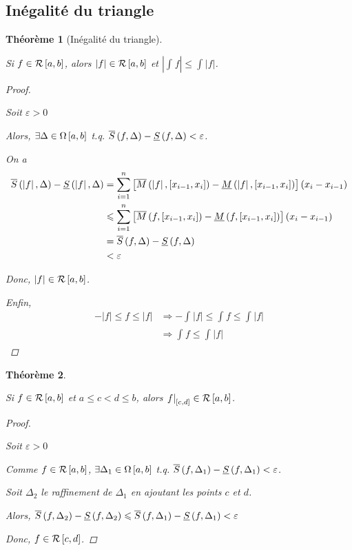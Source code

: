 \documentclass{report}
\newcommand*{\dsum}[4]{\displaystyle\sum_{#1=#2}^{#3}#4}
\newcommand*{\dint}[3]{\displaystyle\int_{#1}^{#2}#3}
\newcommand*{\abs}[1]{\left| #1 \right|}
\newcommand*{\eps}{\varepsilon}
\newcommand*{\lte}{\leqslant}
\newtheorem*{thm}{Th\'eor\`eme}
\theoremstyle{definition}
\theoremstyle{remark}
\begin{document}
	\subsection{In\'egalit\'e du triangle}
	\begin{thm}[In\'egalit\'e du triangle]
		~

		Si $f \in \riemann$, alors $\abs{f} \in \riemann$ et $\abs{\dint{}{}{f}} \lte \dint{}{}{\abs{f}}$.
		\begin{proof}~

			Soit $\eps>0$

			Alors, $\exists\Delta \in \partitions$ t.q. $\ssup{f}-\sinf{f}<\eps$.

			On a
			\begin{align*}
				\ssup{\abs{f}}-\sinf{\abs{f}}&= \dsum{i}{1}{n}{\left[ \msup{\abs{f}}[x_{i-1},x_i] - \minf{\abs{f}}[x_{i-1},x_i] \right] \left( x_i-x_{i-1} \right)}\\
				&\lte \dsum{i}{1}{n}{\left[ \msup{f}[x_{i-1},x_i] - \minf{f}[x_{i-1},x_i] \right] \left( x_i-x_{i-1} \right)}\\
				&= \ssup{f}-\sinf{f}\\
				&< \eps
			\end{align*}

			Donc, $\abs{f} \in \riemann$.

			Enfin,
			\begin{align*}
				-\abs{f} \lte f \lte \abs{f}&\Rightarrow -\dint{}{}{\abs{f}} \lte \dint{}{}{f} \lte \dint{}{}{\abs{f}}\\
				&\Rightarrow \dint{}{}{f} \lte \dint{}{}{\abs{f}}
			\end{align*}
		\end{proof}
	\end{thm}
	\begin{thm}
		~

		Si $f \in \riemann$ et $a \lte c < d \lte b$, alors $\left. f \right|_{[c,d]} \in \riemann$.
		\begin{proof}~

			Soit $\eps>0$

			Comme $f \in \riemann$, $\exists\Delta_1 \in \partitions$ t.q. $\ssup{f}[\Delta_1]-\sinf{f}[\Delta_1] < \eps$.

			Soit $\Delta_2$ le raffinement de $\Delta_1$ en ajoutant les points $c$ et $d$.

			Alors, $\ssup{f}[\Delta_2]-\sinf{f}[\Delta_2] \lte \ssup{f}[\Delta_1]-\sinf{f}[\Delta_1] < \eps$

			Donc, $f \in \riemann[c,d]$.
		\end{proof}
	\end{thm}
\end{document}
